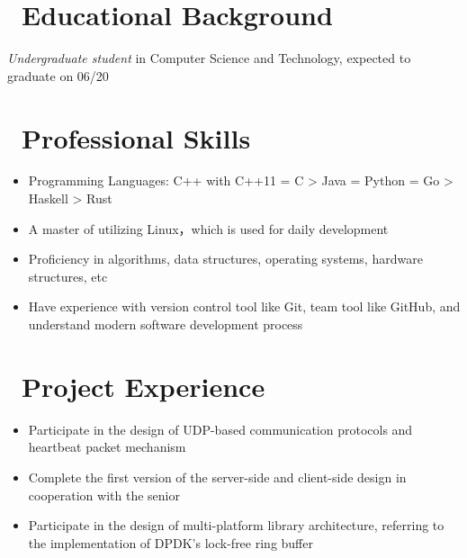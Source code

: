 \documentclass{resume}
\begin{document}



\section{\texorpdfstring{\faGraduationCap\ Educational Background}{Educational Background}}
\textit{Undergraduate student} in Computer Science and Technology, expected to graduate on 06/20

\section{\texorpdfstring{\faCogs\ Professional Skills}{Professional Skills}}
\begin{itemize}[parsep=0.5ex]
  \item Programming Languages: C++ with C++11 = C > Java = Python = Go > Haskell > Rust
  \item A master of utilizing Linux，which is used for daily development
  \item Proficiency in algorithms, data structures, operating systems, hardware structures, etc
  \item Have experience with version control tool like Git, team tool like GitHub, and understand modern software development process
\end{itemize}

\section{\texorpdfstring{\faUsers\ Project Experience}{Project Experience}}
\begin{itemize}
  \item Participate in the design of UDP-based communication protocols and heartbeat packet mechanism
  \item Complete the first version of the server-side and client-side design in cooperation with the senior
  \item Participate in the design of multi-platform library architecture, referring to the implementation of DPDK's lock-free ring buffer
\end{itemize}
\end{document}
